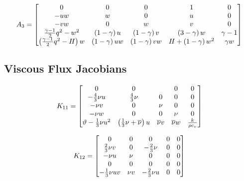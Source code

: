 \begin{equation*}
  A_3 =
  \begin{bmatrix}
    0                                 & 0                   & 0                   & 1                      & 0    \\
    -uw                               & w                   & 0                   & u                      & 0    \\
    -vw                               & 0                   & w                   & v                      & 0    \\
    \frac{\gamma-1}{2}q^2-w^2             & \left(1-\gamma\right)u  & \left(1-\gamma\right)v  & \left(3-\gamma\right)w     & \gamma-1 \\
    \left(\frac{\gamma-1}{2}q^2-H\right)w & \left(1-\gamma\right)uw & \left(1-\gamma\right)vw & H+\left(1-\gamma\right)w^2 & \gamma w
  \end{bmatrix}
\end{equation*}
\normalsize

\subsection{Viscous Flux Jacobians \label{app:viscous_jacobians}}
\large
\begin{equation*}
  K_{11} =
  \begin{bmatrix}
    0                     & 0                            &          & 0        & 0\\
    -\frac{4}{3}\nu u              & \frac{4}{3}\nu                        & 0        & 0        & 0\\ 
    -\nu v                & 0                            & \nu      & 0        & 0\\
    -\nu w                & 0                            & 0        & \nu      & 0\\
    \vartheta - \frac{1}{3}\nu u^2 & \left(\frac{1}{3}\nu + \overline{\nu}\right)u & \overline{\nu} v & \overline{\nu} w & \frac{k}{\rho c_v}
  \end{bmatrix}
\end{equation*}

\begin{equation*}
  K_{12} =
  \begin{bmatrix}
    0          & 0     & 0        & 0 & 0 \\
    \frac{2}{3}\nu v    & 0     & -\frac{2}{3}\nu   & 0 & 0 \\ 
    -\nu u     & \nu   & 0        & 0 & 0 \\
    0          & 0     & 0        & 0 & 0 \\
    -\frac{1}{3}\nu u v & \nu v & -\frac{2}{3}\nu u & 0 & 0
  \end{bmatrix}
\end{equation*}

